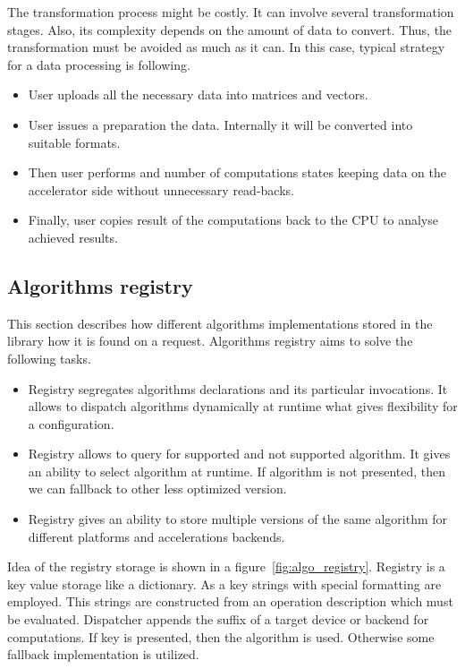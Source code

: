 The transformation process might be costly. It can involve several transformation stages. Also, its complexity depends on the amount of data to convert. Thus, the transformation must be avoided as much as it can. In this case, typical strategy for a data processing is following. 

\begin{itemize}
    \item User uploads all the necessary data into matrices and vectors.
    \item User issues a preparation the data. Internally it will be converted into suitable formats.
    \item Then user performs and number of computations states keeping data on the accelerator side without unnecessary read-backs.
    \item Finally, user copies result of the computations back to the CPU to analyse achieved results.
\end{itemize}

\subsection{Algorithms registry}

This section describes how different algorithms implementations stored in the library how it is found on a request. Algorithms registry aims to solve the following tasks.

\begin{itemize}
    \item Registry segregates algorithms declarations and its particular invocations. It allows to dispatch algorithms dynamically at runtime what gives flexibility for a configuration.
    \item Registry allows to query for supported and not supported algorithm. It gives an ability to select algorithm at runtime. If algorithm is not presented, then we can fallback to other less optimized version.
    \item Registry gives an ability to store multiple versions of the same algorithm for different platforms and accelerations backends.
\end{itemize}

Idea of the registry storage is shown in a figure~\ref{fig:algo_registry}. Registry is a key value storage like a dictionary. As a key strings with special formatting are employed. This strings are constructed from an operation description which must be evaluated. Dispatcher appends the suffix of a target device or backend for computations. If key is presented, then the algorithm is used. Otherwise some fallback implementation is utilized.

